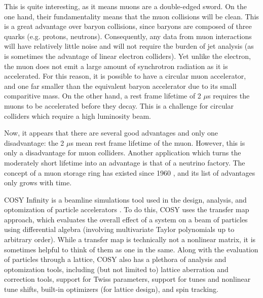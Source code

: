 This is quite interesting, as it means muons are a double-edged sword. On the one hand, their fundamentality means that the muon collisions will be clean. This is a great advantage over baryon collisions, since baryons are composed of three quarks (e.g. protons, neutrons). Consequently, any data from muon interactions will have relatively little noise and will not require the burden of jet analysis (as is sometimes the advantage of linear electron colliders). Yet unlike the electron, the muon does not emit a large amount of synchrotron radiation as it is accelerated. For this reason, it is possible to have a circular muon accelerator, and one far smaller than the equivalent baryon accelerator due to its small comparitive mass. On the other hand, a rest frame lifetime of 2 $\mu$s requires the muons to be accelerated before they decay. This is a challenge for circular colliders which require a high luminosity beam.

Now, it appears that there are several good advantages and only one disadvantage: the 2 $\mu$s mean rest frame lifetime of the muon. However, this is only a disadvantage for muon colliders. Another application which turns the moderately short lifetime into an advantage is that of a neutrino factory. The concept of a muon storage ring has existed since 1960 \cite{unpublishedring}, and its list of advantages only grows with time. 

\par
COSY Infinity is a beamline simulations tool used in the design, analysis, and optomization of particle accelerators \cite{cosy}. To do this, COSY uses the transfer map approach, which evaluates the overall effect of a system on a beam of particles  using differential algebra (involving multivariate Taylor polynomials up to arbitrary order). While a transfer map is technically not a nonlinear matrix, it is sometimes helpful to think of them as one in the same. Along with the evaluation of particles through a lattice, COSY also has a plethora of analysis and optomization tools, including (but not limited to) lattice aberration and correction tools, support for Twiss parameters, support for tunes and nonlinear tune shifts, built-in optimizers (for lattice design), and spin tracking. \par

